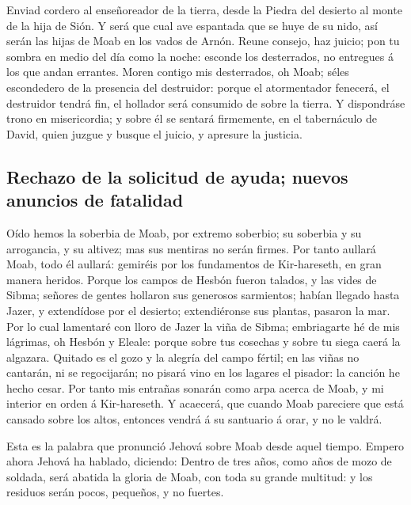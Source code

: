 Enviad cordero al enseñoreador de la tierra, desde la
Piedra del desierto al monte de la hija de Sión.  Y será
que cual ave espantada que se huye de su nido, así serán las hijas de
Moab en los vados de Arnón.  Reune consejo, haz juicio;
pon tu sombra en medio del día como la noche: esconde los desterrados,
no entregues á los que andan errantes.  Moren contigo mis
desterrados, oh Moab; séles escondedero de la presencia del destruidor:
porque el atormentador fenecerá, el destruidor tendrá fin, el hollador
será consumido de sobre la tierra.  Y dispondráse trono en
misericordia; y sobre él se sentará firmemente, en el tabernáculo de
David, quien juzgue y busque el juicio, y apresure la justicia.

\hypertarget{rechazo-de-la-solicitud-de-ayuda-nuevos-anuncios-de-fatalidad}{%
\subsection{Rechazo de la solicitud de ayuda; nuevos anuncios de
fatalidad}\label{rechazo-de-la-solicitud-de-ayuda-nuevos-anuncios-de-fatalidad}}

 Oído hemos la soberbia de Moab, por extremo soberbio; su
soberbia y su arrogancia, y su altivez; mas sus mentiras no serán
firmes.  Por tanto aullará Moab, todo él aullará: gemiréis
por los fundamentos de Kir-hareseth, en gran manera heridos.
 Porque los campos de Hesbón fueron talados, y las vides
de Sibma; señores de gentes hollaron sus generosos sarmientos; habían
llegado hasta Jazer, y extendídose por el desierto; extendiéronse sus
plantas, pasaron la mar.  Por lo cual lamentaré con lloro
de Jazer la viña de Sibma; embriagarte hé de mis lágrimas, oh Hesbón y
Eleale: porque sobre tus cosechas y sobre tu siega caerá la algazara.
 Quitado es el gozo y la alegría del campo fértil; en las
viñas no cantarán, ni se regocijarán; no pisará vino en los lagares el
pisador: la canción he hecho cesar.  Por tanto mis
entrañas sonarán como arpa acerca de Moab, y mi interior en orden á
Kir-hareseth.  Y acaecerá, que cuando Moab pareciere que
está cansado sobre los altos, entonces vendrá á su santuario á orar, y
no le valdrá.

 Esta es la palabra que pronunció Jehová sobre Moab desde
aquel tiempo.  Empero ahora Jehová ha hablado, diciendo:
Dentro de tres años, como años de mozo de soldada, será abatida la
gloria de Moab, con toda su grande multitud: y los residuos serán pocos,
pequeños, y no fuertes.

